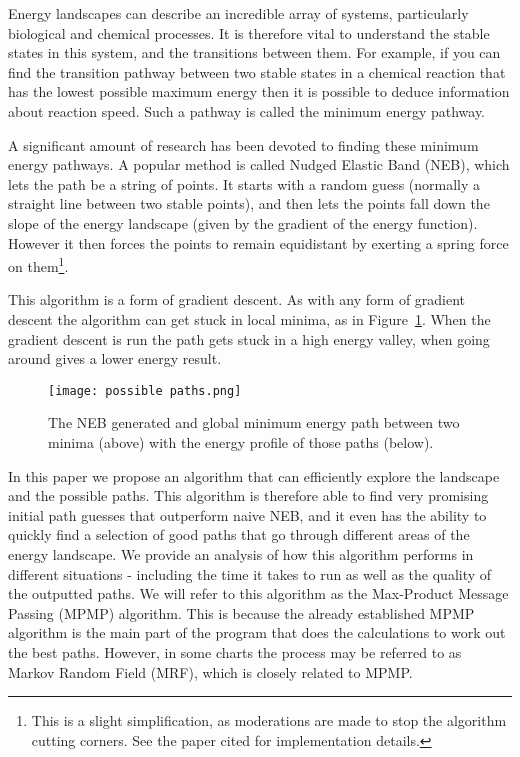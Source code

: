 Energy landscapes can describe an incredible array of systems, particularly biological and chemical processes.
It is therefore vital to understand the stable states in this system, and the transitions between them.
For example, if you can find the transition pathway between two stable states in a chemical reaction that has the lowest possible maximum energy then it is possible to deduce information about reaction speed.
Such a pathway is called the minimum energy pathway.

A significant amount of research has been devoted to finding these minimum energy pathways.
A popular method is called Nudged Elastic Band (NEB), which lets the path be a string of points.
It starts with a random guess (normally a straight line between two stable points), and then lets the points fall down the slope of the energy landscape (given by the gradient of the energy function).
However it then forces the points to remain equidistant by exerting a spring force on them\footnote{This is a slight simplification, as moderations are made to stop the algorithm cutting corners. See the paper cited for implementation details.}.

This algorithm is a form of gradient descent.
As with any form of gradient descent the algorithm can get stuck in local minima, as in Figure~\ref{fig:global_local_min}.
When the gradient descent is run the path gets stuck in a high energy valley, when going around gives a lower energy result.

\begin{figure}[h]
    \centering
    \texttt{[image: possible paths.png]}
    \caption{The NEB generated and global minimum energy path between two minima (above) with the energy profile of those paths (below).}
    \label{fig:global_local_min}
\end{figure}

In this paper we propose an algorithm that can efficiently explore the landscape and the possible paths.
This algorithm is therefore able to find very promising initial path guesses that outperform naive NEB, and it even has the ability to quickly find a selection of good paths that go through different areas of the energy landscape.
We provide an analysis of how this algorithm performs in different situations - including the time it takes to run as well as the quality of the outputted paths.
We will refer to this algorithm as the Max-Product Message Passing (MPMP) algorithm.
This is because the already established MPMP algorithm is the main part of the program that does the calculations to work out the best paths.
However, in some charts the process may be referred to as Markov Random Field (MRF), which is closely related to MPMP\@.

